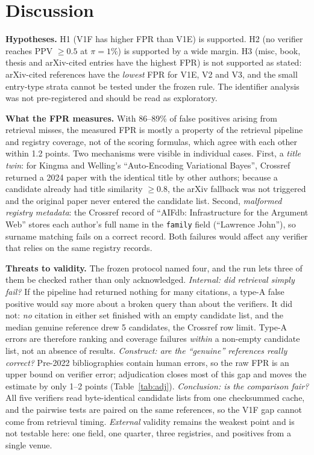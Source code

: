 \documentclass[conference]{IEEEtran}
\begin{document}
\section{Discussion}
\textbf{Hypotheses.} H1 (V1F has higher FPR than V1E) is supported. H2 (no verifier reaches PPV
$\ge 0.5$ at $\pi=1\%$) is supported by a wide margin. H3 (misc, book, thesis and arXiv-cited entries have the
highest FPR) is not supported as stated: arXiv-cited references have the \emph{lowest} FPR for V1E, V2 and
V3, and the small entry-type strata cannot be tested under the frozen rule. The identifier analysis was not
pre-registered and should be read as exploratory.

\textbf{What the FPR measures.} With 86--89\% of false positives arising from retrieval misses, the measured FPR
is mostly a property of the retrieval pipeline and registry coverage, not of the scoring formulas, which
agree with each other within 1.2 points. Two mechanisms were visible in individual cases. First, a
\emph{title twin}: for Kingma and Welling's ``Auto-Encoding Variational Bayes'', Crossref returned a 2024
paper with the identical title by other authors; because a candidate already had title similarity
$\ge 0.8$, the arXiv fallback was not triggered and the original paper never entered the candidate list.
Second, \emph{malformed registry metadata}: the Crossref record of ``AIFdb: Infrastructure for the
Argument Web'' stores each author's full name in the \texttt{family} field (``Lawrence John''), so surname
matching fails on a correct record. Both failures would affect any verifier that relies on the same registry records.

\textbf{Threats to validity.} The frozen protocol named four, and the run lets three of them be
checked rather than only acknowledged.
\emph{Internal: did retrieval simply fail?} If the pipeline had returned nothing for many citations,
a type-A false positive would say more about a broken query than about the verifiers. It did not:
\emph{no} citation in either set finished with an empty candidate list, and the median genuine
reference drew 5 candidates, the Crossref row limit. Type-A errors are therefore ranking and coverage
failures \emph{within} a non-empty candidate list, not an absence of results.
\emph{Construct: are the ``genuine'' references really correct?} Pre-2022 bibliographies contain human
errors, so the raw FPR is an upper bound on verifier error; adjudication closes most of this gap and
moves the estimate by only 1--2 points (Table~\ref{tab:adj}).
\emph{Conclusion: is the comparison fair?} All five verifiers read byte-identical candidate lists from
one checksummed cache, and the pairwise tests are paired on the same references, so the V1F gap cannot
come from retrieval timing.
\emph{External} validity remains the weakest point and is not testable here: one field, one quarter,
three registries, and positives from a single venue.
\end{document}
